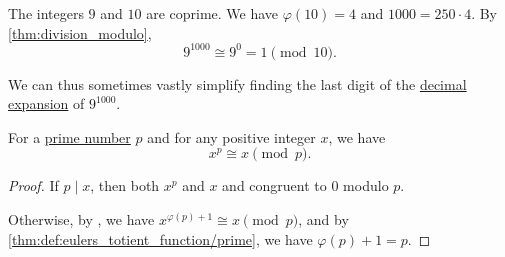 \begin{example}\label{ex:thm:division_modulo}
  The integers \( 9 \) and \( 10 \) are coprime. We have \( \varphi(10) = 4 \) and \( 1000 = 250 \cdot 4 \). By \cref{thm:division_modulo},
  \begin{equation*}
    9^{1000} \cong 9^0 = 1 \pmod {10}.
  \end{equation*}

  We can thus sometimes vastly simplify finding the last digit of the \hyperref[def:positional_number_system/decimal]{decimal expansion} of \( 9^{1000} \).
\end{example}

\begin{theorem}\label{thm:fermats_little_theorem}
  For a \hyperref[def:prime_number]{prime number} \( p \) and for any positive integer \( x \), we have
  \begin{equation*}
    x^p \cong x \pmod p.
  \end{equation*}
\end{theorem}
\begin{proof}
  If \( p \mid x \), then both \( x^p \) and \( x \) and congruent to \( 0 \) modulo \( p \).

  Otherwise, by , we have \( x^{\varphi(p) + 1} \cong x \pmod p \), and by \cref{thm:def:eulers_totient_function/prime}, we have \( \varphi(p) + 1 = p \).
\end{proof}
